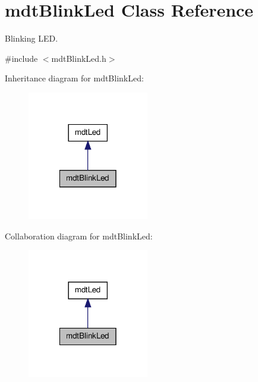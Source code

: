 \hypertarget{classmdt_blink_led}{
\section{mdtBlinkLed Class Reference}
\label{classmdt_blink_led}
}


Blinking LED.  




{\ttfamily \#include $<$mdtBlinkLed.h$>$}



Inheritance diagram for mdtBlinkLed:\nopagebreak
\begin{figure}[H]
\begin{center}
\leavevmode
\includegraphics[width=150pt]{classmdt_blink_led__inherit__graph}
\end{center}
\end{figure}


Collaboration diagram for mdtBlinkLed:\nopagebreak
\begin{figure}[H]
\begin{center}
\leavevmode
\includegraphics[width=150pt]{classmdt_blink_led__coll__graph}
\end{center}
\end{figure}

